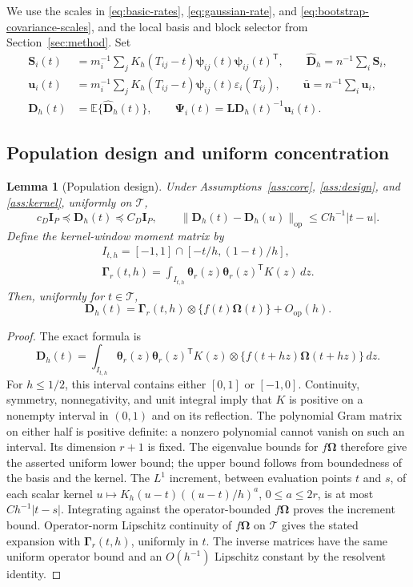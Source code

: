 \documentclass[10pt]{book}
\newtheorem{lemma}{Lemma}
\newcommand{\bu}{{\mathbf u}}
\newcommand{\bD}{{\mathbf D}}
\newcommand{\bI}{{\mathbf I}}
\newcommand{\bL}{{\mathbf L}}
\newcommand{\bS}{{\mathbf S}}
\newcommand{\btheta}  {\boldsymbol{\theta}}
\newcommand{\bpsi} {\boldsymbol{{\mathbf \psi}}}
\newcommand{\bGamma} {\boldsymbol{\Gamma}}
\newcommand{\bPsi} {\boldsymbol{\Psi}}
\newcommand{\bOmega} {\boldsymbol{\Omega}}
\newcommand{\expect}{\mathbb{E}}
\newcommand{\trans}{{\scriptscriptstyle\mathsf{T}}}
\numberwithin{equation}{section}
\begin{document}
We use the scales in \eqref{eq:basic-rates},
\eqref{eq:gaussian-rate}, and \eqref{eq:bootstrap-covariance-scales},
and the local basis and block selector from Section~\ref{sec:method}.
Set
\[
\begin{split}
\bS_i(t)&=m_i^{-1}\sum_jK_h(T_{ij}-t)
\bpsi_{ij}(t)\bpsi_{ij}(t)^\trans,\qquad
\widehat{\bD}_h=n^{-1}\sum_i\bS_i,\\
\bu_i(t)&=m_i^{-1}\sum_jK_h(T_{ij}-t)
\bpsi_{ij}(t)\varepsilon_i(T_{ij}),\qquad
\bar\bu=n^{-1}\sum_i\bu_i,\\
\bD_h(t)&=\expect\{\widehat{\bD}_h(t)\},\qquad
\bPsi_i(t)=\bL\bD_h(t)^{-1}\bu_i(t).
\end{split}
\]

\subsection{Population design and uniform concentration}

\begin{lemma}[Population design]\label{lem:hd-population}
Under Assumptions~\ref{ass:core}, \ref{ass:design}, and
\ref{ass:kernel}, uniformly on $\mathcal T$,
\[
c_D\bI_P\preceq\bD_h(t)\preceq C_D\bI_P,
\qquad
\|\bD_h(t)-\bD_h(u)\|_{\mathrm{op}}
\le Ch^{-1}|t-u|.
\]
Define the kernel-window moment matrix by
\[
\begin{gathered}
I_{t,h}=[-1,1]\cap[-t/h,(1-t)/h],\\
\bGamma_r(t,h)=\int_{I_{t,h}}
\btheta_r(z)\btheta_r(z)^\trans K(z)\,dz.
\end{gathered}
\]
Then, uniformly for $t\in\mathcal T$,
\[
\bD_h(t)=\bGamma_r(t,h)\otimes\{f(t)\bOmega(t)\}
+O_{\mathrm{op}}(h).
\]
\end{lemma}

\begin{proof}
The exact formula is
\[
\bD_h(t)=\int_{I_{t,h}}\btheta_r(z)\btheta_r(z)^\trans K(z)
\otimes\{f(t+hz)\bOmega(t+hz)\}\,dz.
\]
For $h\le1/2$, this interval contains either $[0,1]$ or $[-1,0]$.
Continuity, symmetry, nonnegativity, and unit integral imply that $K$
is positive on a nonempty interval in $(0,1)$ and on its reflection.
The polynomial Gram matrix on either half is positive definite:
a nonzero polynomial cannot vanish on such an interval.  Its dimension
$r+1$ is fixed.  The eigenvalue bounds for $f\bOmega$ therefore give
the asserted uniform lower bound; the upper bound
follows from boundedness of the basis and the kernel.
The $L^1$ increment, between evaluation points $t$ and $s$, of each
scalar kernel $u\mapsto K_h(u-t)((u-t)/h)^a$, $0\le a\le2r$,
is at most $Ch^{-1}|t-s|$.
Integrating against the operator-bounded $f\bOmega$ proves the
increment bound. Operator-norm Lipschitz continuity of $f\bOmega$
on $\mathcal T$ gives the stated expansion with $\bGamma_r(t,h)$,
uniformly in $t$.  The inverse matrices have
the same uniform operator bound and an $O(h^{-1})$ Lipschitz constant
by the resolvent identity.
\end{proof}
\end{document}
